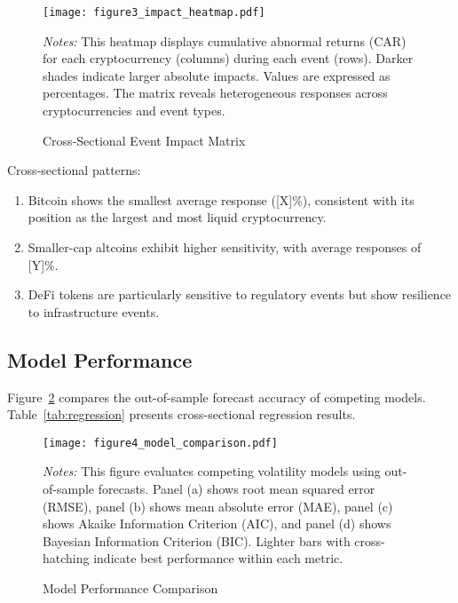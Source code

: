 \documentclass[12pt]{article}
\begin{document}
\begin{figure}[htbp]
    \centering
    \texttt{[image: figure3\_impact\_heatmap.pdf]}
    \caption{Cross-Sectional Event Impact Matrix}
    \label{fig:heatmap}
    \begin{minipage}{\textwidth}
        \small
        \textit{Notes:} This heatmap displays cumulative abnormal returns (CAR) for each cryptocurrency (columns) during each event (rows). Darker shades indicate larger absolute impacts. Values are expressed as percentages. The matrix reveals heterogeneous responses across cryptocurrencies and event types.
    \end{minipage}
\end{figure}



Cross-sectional patterns:

\begin{enumerate}
    \item Bitcoin shows the smallest average response ([X]\%), consistent with its position as the largest and most liquid cryptocurrency.

    \item Smaller-cap altcoins exhibit higher sensitivity, with average responses of [Y]\%.

    \item DeFi tokens are particularly sensitive to regulatory events but show resilience to infrastructure events.
\end{enumerate}

\subsection{Model Performance}

Figure~\ref{fig:models} compares the out-of-sample forecast accuracy of competing models. Table~\ref{tab:regression} presents cross-sectional regression results.

\begin{figure}[htbp]
    \centering
    \texttt{[image: figure4\_model\_comparison.pdf]}
    \caption{Model Performance Comparison}
    \label{fig:models}
    \begin{minipage}{\textwidth}
        \small
        \textit{Notes:} This figure evaluates competing volatility models using out-of-sample forecasts. Panel (a) shows root mean squared error (RMSE), panel (b) shows mean absolute error (MAE), panel (c) shows Akaike Information Criterion (AIC), and panel (d) shows Bayesian Information Criterion (BIC). Lighter bars with cross-hatching indicate best performance within each metric.
    \end{minipage}
\end{figure}
\end{document}
